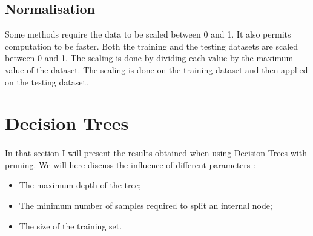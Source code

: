 \documentclass[10pt]{article}
\begin{document}
		\subsection*{Normalisation}
			Some methods require the data to be scaled between 0 and 1. It also permits computation to be faster. Both the training and the testing datasets are scaled between 0 and 1. The scaling is done by dividing each value by the maximum value of the dataset. The scaling is done on the training dataset and then applied on the testing dataset.
	\section{Decision Trees}
		\paragraph*{}
			In that section I will present the results obtained when using Decision Trees with pruning. We will here discuss the influence of different parameters :
			\begin{itemize}
				\item The maximum depth of the tree;
				\item The minimum number of samples required to split an internal node;
				\item The size of the training set.
			\end{itemize}
\end{document}
